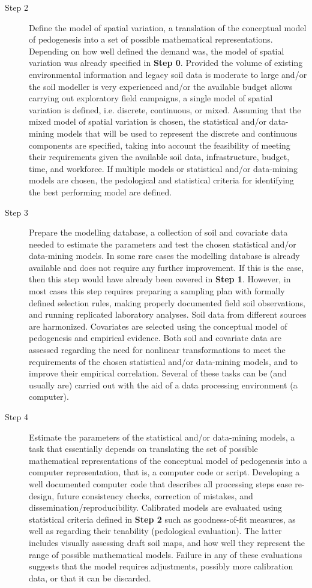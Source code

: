 \begin{description}
\item[Step 2] Define the model of spatial variation, a translation of the conceptual model of pedogenesis into 
a set of possible mathematical representations. Depending on how well defined the demand was, the model of 
spatial variation was already specified in \textbf{Step 0}. Provided the volume of existing environmental 
information and legacy soil data is moderate to large and/or the soil modeller is very experienced and/or the 
available budget allows carrying out exploratory field campaigns, a single model of spatial variation is
defined, i.e. discrete, continuous, or mixed. Assuming that the mixed model of spatial variation is chosen, 
the statistical and/or data-mining models that will be used to represent the discrete and continuous 
components are specified, taking into account the feasibility of meeting their requirements given the 
available soil data, infrastructure, budget, time, and workforce. If multiple models or statistical and/or 
data-mining models are chosen, the pedological and statistical criteria for identifying the best performing 
model are defined.

\item[Step 3] Prepare the modelling database, a collection of soil and covariate data needed to estimate the 
parameters and test the chosen statistical and/or data-mining models. In some rare cases the modelling 
database is already available and does not require any further improvement. If this is the case, then this 
step would have already been covered in \textbf{Step 1}. However, in most cases this step requires preparing a
sampling plan with formally defined selection rules, making properly documented field soil observations, and 
running replicated laboratory analyses. Soil data from different sources are harmonized. Covariates are 
selected using the conceptual model of pedogenesis and empirical evidence. Both soil and covariate data are 
assessed regarding the need for nonlinear transformations to meet the requirements of the chosen statistical 
and/or data-mining models, and to improve their empirical correlation. Several of these tasks can be (and
usually are) carried out with the aid of a data processing environment (a computer).

\item[Step 4] Estimate the parameters of the statistical and/or data-mining models, a task that essentially 
depends on translating the set of possible mathematical representations of the conceptual model of pedogenesis 
into a computer representation, that is, a computer code or script. Developing a well documented computer code 
that describes all processing steps ease re-design, future consistency checks, correction of mistakes, and 
dissemination/reproducibility. Calibrated models are evaluated using statistical criteria defined in 
\textbf{Step 2} such as goodness-of-fit measures, as well as regarding their tenability (pedological 
evaluation). The latter includes visually assessing draft soil maps, and how well they represent the range of 
possible mathematical models. Failure in any of these evaluations suggests that the model requires adjustments,
possibly more calibration data, or that it can be discarded.


\end{description}

